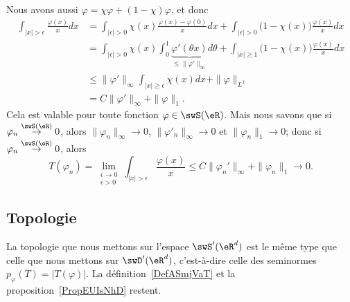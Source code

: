 \begin{example}
	Nous avons aussi \( \varphi=\chi\varphi+(1-\chi)\varphi\), et donc
	\begin{subequations}
		\begin{align}
			\int_{| x |>\epsilon}\frac{ \varphi(x) }{ x }dx & =\int_{| \epsilon |>0}\chi(x)\frac{ \varphi(x)-\varphi(0) }{ x }dx+\int_{| \epsilon |>0}\big( 1-\chi(x) \big)\frac{ \varphi(x) }{ x }dx                                      \\
			                                                & =\int_{| \epsilon |>0}\chi(x)\int_0^1\underbrace{\varphi'(\theta x)}_{\leq \| \varphi' \|_{\infty}}d\theta+\int_{| x |\geq 1}\big( 1-\chi(x) \big)\frac{ \varphi(x) }{ x }dx \\
			                                                & \leq\| \varphi' \|_{\infty}\int_{| x |\geq \epsilon}\chi(x)dx+\| \varphi \|_{L^1}                                                                                            \\
			                                                & =C\| \varphi' \|_{\infty}+\| \varphi \|_{1}.
		\end{align}
	\end{subequations}
	Cela est valable pour toute fonction \( \varphi\in\swS(\eR)\). Mais nous savons que si \( \varphi_n\stackrel{\swS(\eR)}{\to}0\), alors \( \| \varphi_n \|_{\infty}\to 0\), \( \| \varphi'_n \|_{\infty}\to 0\) et \( \| \varphi_n \|_1\to 0\); donc si \( \varphi_n\stackrel{\swS(\eR)}{\to}0\), alors
	\begin{equation}
		T(\varphi_n)=\lim_{\substack{\epsilon\to 0\\\epsilon>0}}\int_{| x |>\epsilon}\frac{ \varphi(x) }{ x }\leq C\| \varphi_n' \|_{\infty}+\| \varphi_n \|_1\to 0.
	\end{equation}
\end{example}

\subsection{Topologie}

La topologie que nous mettons sur l'espace \( \swS'(\eR^d)\) est le même type que celle que nous mettons sur \( \swD'(\eR^d)\), c'est-à-dire celle des seminormes \( p_{\varphi}(T)=| T(\varphi) |\). La définition~\ref{DefASmjVaT} et la proposition~\ref{PropEUIsNhD} restent.

